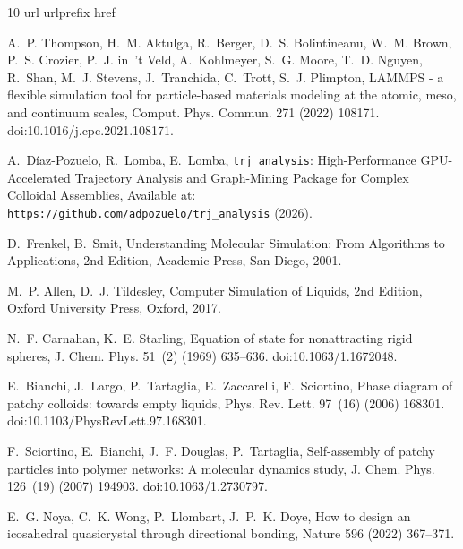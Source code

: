 \documentclass[final,5p,times,twocolumn]{elsarticle}
\begin{document}
\begin{thebibliography}{10}
\expandafter\ifx\csname url\endcsname\relax
  \def\url#1{\texttt{#1}}\fi
\expandafter\ifx\csname urlprefix\endcsname\relax\def\urlprefix{URL }\fi
\expandafter\ifx\csname href\endcsname\relax
  \def\href#1#2{#2} \def\path#1{#1}\fi

A.~P. Thompson, H.~M. Aktulga, R.~Berger, D.~S. Bolintineanu, W.~M. Brown,
  P.~S. Crozier, P.~J. in~'t Veld, A.~Kohlmeyer, S.~G. Moore, T.~D. Nguyen,
  R.~Shan, M.~J. Stevens, J.~Tranchida, C.~Trott, S.~J. Plimpton, {LAMMPS} - a
  flexible simulation tool for particle-based materials modeling at the atomic,
  meso, and continuum scales, Comput. Phys. Commun. 271 (2022) 108171.
\newblock \href {https://doi.org/10.1016/j.cpc.2021.108171}
  {\path{doi:10.1016/j.cpc.2021.108171}}.

A.~D{\'{i}}az-Pozuelo, R.~Lomba, E.~Lomba, {\texttt{trj\_analysis}:
  High-Performance GPU-Accelerated Trajectory Analysis and Graph-Mining Package
  for Complex Colloidal Assemblies}, Available at:
  \url{https://github.com/adpozuelo/trj_analysis} (2026).

D.~Frenkel, B.~Smit, Understanding Molecular Simulation: From Algorithms to
  Applications, 2nd Edition, Academic Press, San Diego, 2001.

M.~P. Allen, D.~J. Tildesley, Computer Simulation of Liquids, 2nd Edition,
  Oxford University Press, Oxford, 2017.

N.~F. Carnahan, K.~E. Starling, Equation of state for nonattracting rigid
  spheres, J. Chem. Phys. 51~(2) (1969) 635--636.
\newblock \href {https://doi.org/10.1063/1.1672048}
  {\path{doi:10.1063/1.1672048}}.

E.~Bianchi, J.~Largo, P.~Tartaglia, E.~Zaccarelli, F.~Sciortino, Phase diagram
  of patchy colloids: towards empty liquids, Phys. Rev. Lett. 97~(16) (2006)
  168301.
\newblock \href {https://doi.org/10.1103/PhysRevLett.97.168301}
  {\path{doi:10.1103/PhysRevLett.97.168301}}.

F.~Sciortino, E.~Bianchi, J.~F. Douglas, P.~Tartaglia, Self-assembly of patchy
  particles into polymer networks: A molecular dynamics study, J. Chem. Phys.
  126~(19) (2007) 194903.
\newblock \href {https://doi.org/10.1063/1.2730797}
  {\path{doi:10.1063/1.2730797}}.

E.~G. Noya, C.~K. Wong, P.~Llombart, J.~P.~K. Doye, How to design an
  icosahedral quasicrystal through directional bonding, Nature 596 (2022)
  367--371.


\end{thebibliography}
\end{document}
